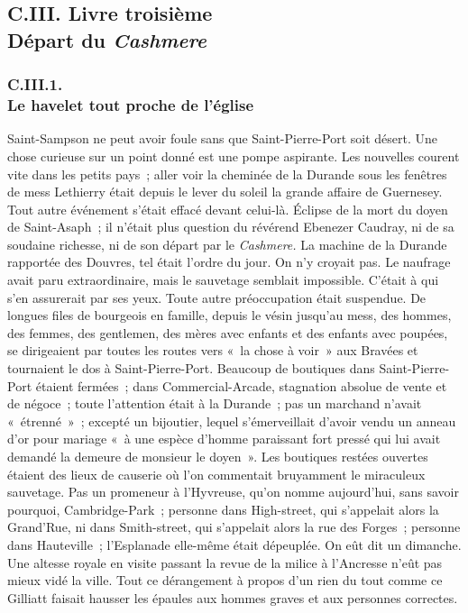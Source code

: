 \documentclass[french,twoside]{book} %
\begin{document}
  \subsection[{C.III. Livre troisième. Départ du Cashmere}]{C.III. Livre troisième \\
Départ du \emph{Cashmere}}
  \subsubsection[{C.III.1. Le havelet tout proche de l’église}]{C.III.1. \\
Le havelet tout proche de l’église}
\noindent Saint-Sampson ne peut avoir foule sans que Saint-Pierre-Port soit désert. Une chose curieuse sur un point donné est une pompe aspirante. Les nouvelles courent vite dans les petits pays ; aller voir la cheminée de la Durande sous les fenêtres de mess Lethierry était depuis le lever du soleil la grande affaire de Guernesey. Tout autre événement s’était effacé devant celui-là. Éclipse de la mort du doyen de Saint-Asaph ; il n’était plus question du révérend Ebenezer Caudray, ni de sa soudaine richesse, ni de son départ par le \emph{Cashmere.} La machine de la Durande rapportée des Douvres, tel était l’ordre du jour. On n’y croyait pas. Le naufrage avait paru extraordinaire, mais le sauvetage semblait impossible. C’était à qui s’en assurerait  par ses yeux. Toute autre préoccupation était suspendue. De longues files de bourgeois en famille, depuis le vésin jusqu’au mess, des hommes, des femmes, des gentlemen, des mères avec enfants et des enfants avec poupées, se dirigeaient par toutes les routes vers « la chose à voir » aux Bravées et tournaient le dos à Saint-Pierre-Port. Beaucoup de boutiques dans Saint-Pierre-Port étaient fermées ; dans Commercial-Arcade, stagnation absolue de vente et de négoce ; toute l’attention était à la Durande ; pas un marchand n’avait « étrenné » ; excepté un bijoutier, lequel s’émerveillait d’avoir vendu un anneau d’or pour mariage « à une espèce d’homme paraissant fort pressé qui lui avait demandé la demeure de monsieur le doyen ». Les boutiques restées ouvertes étaient des lieux de causerie où l’on commentait bruyamment le miraculeux sauvetage. Pas un promeneur à l’Hyvreuse, qu’on nomme aujourd’hui, sans savoir pourquoi, Cambridge-Park ; personne dans High-street, qui s’appelait alors la Grand’Rue, ni dans Smith-street, qui s’appelait alors la rue des Forges ; personne dans Hauteville ; l’Esplanade elle-même était dépeuplée. On eût dit un dimanche. Une altesse royale en visite passant la revue de la milice à l’Ancresse n’eût pas mieux vidé la ville. Tout ce dérangement à propos d’un rien du tout comme ce Gilliatt faisait hausser les épaules aux hommes graves et aux personnes correctes.\par
\end{document}
